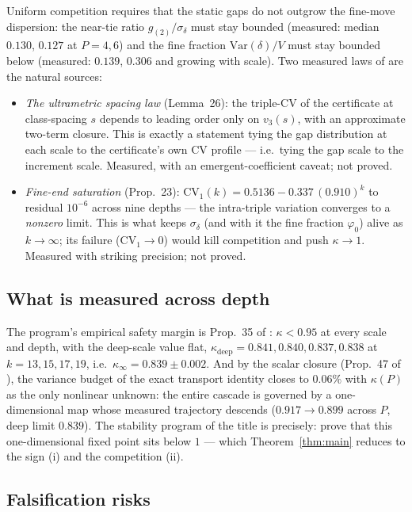 \documentclass[11pt]{article}
\theoremstyle{definition}
\theoremstyle{remark}
\newcommand{\CV}{\mathrm{CV}}
\newcommand{\Var}{\mathrm{Var}}
\newcommand{\kap}{\kappa}
\newcommand{\dl}{\delta}
\begin{document}
Uniform competition requires that the static gaps do not outgrow the
fine-move dispersion: the near-tie ratio $g_{(2)}/\sigma_\dl$ must stay
bounded (measured: median $0.130$, $0.127$ at $P = 4, 6$) and the fine
fraction $\Var(\dl)/V$ must stay bounded below (measured: $0.139$,
$0.306$ and growing with scale). Two measured laws of \cite{NOTE} are
the natural sources:
\begin{itemize}
\item \emph{The ultrametric spacing law} (Lemma~26): the triple-$\CV$ of
the certificate at class-spacing $s$ depends to leading order only on
$v_3(s)$, with an approximate two-term closure. This is exactly a
statement tying the gap distribution at each scale to the certificate's
own $\CV$ profile --- i.e.\ tying the gap scale to the increment scale.
Measured, with an emergent-coefficient caveat; not proved.
\item \emph{Fine-end saturation} (Prop.~23): $\CV_1(k) = 0.5136 -
0.337\,(0.910)^k$ to residual $10^{-6}$ across nine depths --- the
intra-triple variation converges to a \emph{nonzero} limit. This is
what keeps $\sigma_\dl$ (and with it the fine fraction $\varphi_0$)
alive as $k \to \infty$; its failure ($\CV_1 \to 0$) would kill
competition and push $\kap \to 1$. Measured with striking precision;
not proved.
\end{itemize}

\subsection{What is measured across depth}

The program's empirical safety margin is Prop.~35 of \cite{NOTE}:
$\kap < 0.95$ at every scale and depth, with the deep-scale value flat,
$\kap_{\mathrm{deep}} = 0.841, 0.840, 0.837, 0.838$ at
$k = 13, 15, 17, 19$, i.e.\ $\kap_\infty = 0.839 \pm 0.002$. And by the
scalar closure (Prop.~47 of \cite{NOTE}), the variance budget of the
exact transport identity closes to $0.06\%$ with $\kap(P)$ as the only
nonlinear unknown: the entire cascade is governed by a one-dimensional
map whose measured trajectory descends ($0.917 \to 0.899$ across $P$,
deep limit $0.839$). The stability program of the title is precisely:
prove that this one-dimensional fixed point sits below $1$ --- which
Theorem~\ref{thm:main} reduces to the sign (i) and the competition (ii).

\subsection{Falsification risks}
\end{document}
